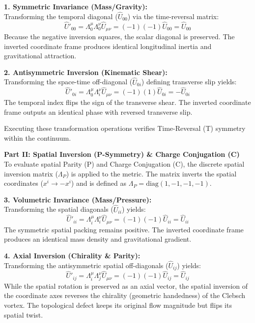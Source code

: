 \textbf{1. Symmetric Invariance (Mass/Gravity):} \\
Transforming the temporal diagonal ($\hat{U}_{00}$) via the time-reversal matrix: 
\begin{equation}
    \hat{U}'_{00} = \Lambda^\mu_0 \Lambda^\nu_0 \hat{U}_{\mu\nu} = (-1)(-1)\hat{U}_{00} = \hat{U}_{00} \label{eq:t_mass_invariance} 
\end{equation}
Because the negative inversion squares, the scalar diagonal is preserved. The inverted coordinate frame produces identical longitudinal inertia and gravitational attraction. 

\textbf{2. Antisymmetric Inversion (Kinematic Shear):} \\ 
Transforming the space-time off-diagonal ($\hat{U}_{0i}$) defining transverse slip yields:
\begin{equation}
    \hat{U}'_{0i} = \Lambda^\mu_0 \Lambda^\nu_i \hat{U}_{\mu\nu} = (-1)(1)\hat{U}_{0i} = -\hat{U}_{0i} \label{eq:t_charge_inversion} 
\end{equation}
The temporal index flips the sign of the transverse shear. The inverted coordinate frame outputs an identical phase with reversed transverse slip. 

Executing these transformation operations verifies Time-Reversal (T) symmetry within the continuum. 

\vspace{0.2 cm} 

\textbf{Part II: Spatial Inversion (P-Symmetry) \& Charge Conjugation (C)} \\ 
To evaluate spatial Parity (P) and Charge Conjugation (C), the discrete spatial inversion matrix ($\Lambda_P$) is applied to the metric. The matrix inverts the spatial coordinates ($x^i \to -x^i$) and is defined as $\Lambda_P = \text{diag}(1, -1, -1, -1)$.

\textbf{3. Volumetric Invariance (Mass/Pressure):} \\ 
Transforming the spatial diagonals ($\hat{U}_{ii}$) yields:
\begin{equation}
    \hat{U}'_{ii} = \Lambda^\mu_i \Lambda^\nu_i \hat{U}_{\mu\nu} = (-1)(-1)\hat{U}_{ii} = \hat{U}_{ii} 
\end{equation}
The symmetric spatial packing remains positive. The inverted coordinate frame produces an identical mass density and gravitational gradient. 

\textbf{4. Axial Inversion (Chirality \& Parity):} \\ 
Transforming the antisymmetric spatial off-diagonals ($\hat{U}_{ij}$) yields:
\begin{equation}
    \hat{U}'_{ij} = \Lambda^\mu_i \Lambda^\nu_j \hat{U}_{\mu\nu} = (-1)(-1)\hat{U}_{ij} = \hat{U}_{ij} 
\end{equation}
While the spatial rotation is preserved as an axial vector, the spatial inversion of the coordinate axes reverses the chirality (geometric handedness) of the Clebsch vortex. The topological defect keeps its original flow magnitude but flips its spatial twist. 


